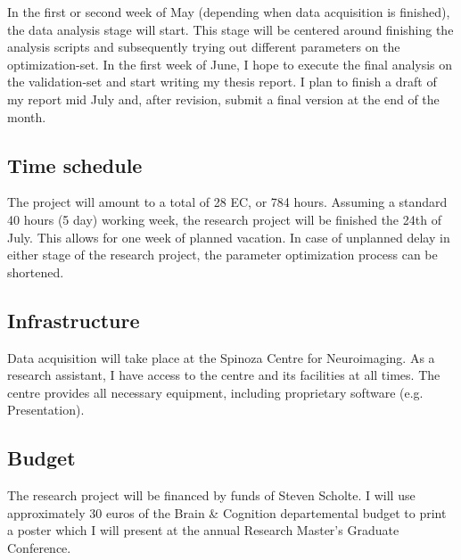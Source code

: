 \documentclass[12pt,a4paper]{article}\usepackage[]{graphicx}\usepackage[]{color}
\begin{document}
In the first or second week of May (depending when data acquisition is finished), the data analysis stage will start. This stage will be centered around finishing the analysis scripts and subsequently trying out different parameters on the optimization-set. In the first week of June, I hope to execute the final analysis on the validation-set and start writing my thesis report. I plan to finish a draft of my report mid July and, after revision, submit a final version at the end of the month.

\subsection{Time schedule}
The project will amount to a total of 28 EC, or  784 hours. Assuming a standard 40 hours (5 day) working week, the research project will be finished the 24th of July. This allows for one week of planned vacation. In case of unplanned delay in either stage of the research project, the parameter optimization process can be shortened. 

\subsection{Infrastructure}
Data acquisition will take place at the Spinoza Centre for Neuroimaging. As a research assistant, I have access to the centre and its facilities at all times. The centre provides all necessary equipment, including proprietary software (e.g. Presentation). 

\subsection{Budget}
The research project will be financed by funds of Steven Scholte. I will use approximately 30 euros of the Brain \& Cognition departemental budget to print a poster which I will present at the annual Research Master's Graduate Conference. \\
\end{document}

